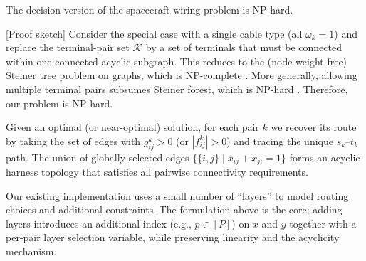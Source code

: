 \begin{lemma}
The decision version of the spacecraft wiring problem is NP-hard.
\end{lemma}
[Proof sketch]
Consider the special case with a single cable type (all $\omega_k=1$) and replace the terminal-pair set $\mathcal K$ by a set of terminals that must be connected within one connected acyclic subgraph.
This reduces to the (node-weight-free) Steiner tree problem on graphs, which is NP-complete \cite{garey1979computers}.
More generally, allowing multiple terminal pairs subsumes Steiner forest, which is NP-hard \cite{goemans1995primal}.
Therefore, our problem is NP-hard.

Given an optimal (or near-optimal) solution, for each pair $k$ we recover its route by taking the set of edges with $g_{ij}^k>0$ (or $|f_{ij}^k|>0$) and tracing the unique $s_k$--$t_k$ path.
The union of globally selected edges $\{\{i,j\}\mid x_{ij}+x_{ji}=1\}$ forms an acyclic harness topology that satisfies all pairwise connectivity requirements.

Our existing implementation uses a small number of ``layers'' to model routing choices and additional constraints.
The formulation above is the core; adding layers introduces an additional index (e.g., $p\in[P]$) on $x$ and $y$ together with a per-pair layer selection variable, while preserving linearity and the acyclicity mechanism.
